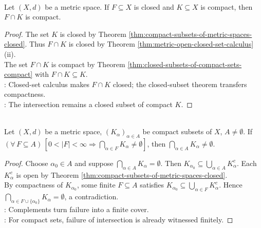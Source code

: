 \begin{corollary} \label{cor:closed-intersection-compact} \\
Let $(X,d)$ be a metric space. If $F\subseteq X$ is closed and $K\subseteq X$ is compact, then $F\cap K$ is compact.
\begin{proof}
The set $K$ is closed by Theorem \ref{thm:compact-subsets-of-metric-spaces-closed}. Thus $F\cap K$ is closed by Theorem \ref{thm:metric-open-closed-set-calculus}(ii).\\
The set $F\cap K$ is compact by Theorem \ref{thm:closed-subsets-of-compact-sets-compact} with $F\cap K\subseteq K$.\\
: Closed-set calculus makes $F\cap K$ closed; the closed-subset theorem transfers compactness.\\
: The intersection remains a closed subset of compact $K$.
\end{proof}
\end{corollary}

\begin{theorem} \label{thm:compact-finite-intersection-property} \\
Let $(X,d)$ be a metric space, $(K_\alpha)_{\alpha\in A}$ be compact subsets of $X$,  $A\ne\emptyset$. If $(\forall\,F\subseteq A)\,[0<|F|<\infty\Rightarrow\bigcap\limits_{\alpha\in F}K_\alpha\ne\emptyset]$, then $\bigcap\limits_{\alpha\in A}K_\alpha\ne\emptyset$.
\begin{proof}
Choose $\alpha_0\in A$ and suppose $\bigcap\limits_{\alpha\in A}K_\alpha=\emptyset$. Then $K_{\alpha_0}\subseteq\bigcup\limits_{\alpha\in A}K_\alpha^c$. Each $K_\alpha^c$ is open by Theorem \ref{thm:compact-subsets-of-metric-spaces-closed}.\\
By compactness of $K_{\alpha_0}$, some finite $F\subseteq A$ satisfies $K_{\alpha_0}\subseteq\bigcup\limits_{\alpha\in F}K_\alpha^c$. Hence $\bigcap\limits_{\alpha\in F\cup\{\alpha_0\}}K_\alpha=\emptyset$, a contradiction.\\
: Complements turn failure into a finite cover.\\
: For compact sets, failure of intersection is already witnessed finitely.
\end{proof}
\end{theorem}

